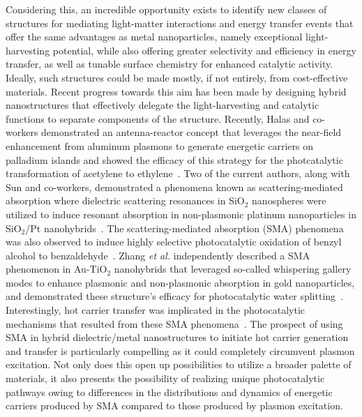 \documentclass[journal=jpclcd,manuscript=article]{achemso}
\begin{document}
Considering this, an incredible opportunity exists to identify new classes of structures for mediating light-matter interactions and energy transfer events that offer the same advantages as metal nanoparticles, 
namely exceptional light-harvesting potential, while also offering greater selectivity and efficiency in energy transfer, as well as tunable surface chemistry for enhanced catalytic activity.  
Ideally, such structures could be made mostly, if not entirely, from cost-effective materials.  Recent progress towards this aim has been made by designing hybrid 
nanostructures that effectively delegate the light-harvesting and catalytic functions to separate components of the structure.  Recently, Halas and co-workers 
demonstrated an antenna-reactor concept that leverages the near-field enhancement from aluminum plasmons to generate energetic carriers on 
palladium islands and showed the efficacy of this strategy for the photcatalytic transformation of acetylene to ethylene~\cite{SZZ_PNAS_2016}.
Two of the current authors, along with Sun and co-workers, demonstrated a phenomena known as scattering-mediated absorption where dielectric
scattering resonances in SiO$_2$ nanospheres were utilized to induce resonant absorption in non-plasmonic platinum nanoparticles in SiO$_2$/Pt nanohybrids~\cite{ZHX_NatPhoton_2016}.
The scattering-mediated absorption (SMA) phenomena was also observed to induce highly selective photocatalytic oxidation of benzyl alcohol to benzaldehyde~\cite{ZHX_NatPhoton_2016}.
Zhang {\it et al.} independently described a SMA phenomenon in Au-TiO$_2$ nanohybrids that leveraged so-called whispering gallery modes to 
enhance plasmonic and non-plasmonic absorption in gold nanoparticles, and demonstrated these structure's efficacy for photocatalytic water splitting~\cite{ZJM_ACSNano_2016}.
Interestingly, hot carrier transfer was implicated in the photocatalytic mechanisms that resulted from these SMA phenomena~\cite{ZHX_NatPhoton_2016,ZJM_ACSNano_2016}.
The prospect of using SMA in hybrid dielectric/metal nanostructures to initiate hot carrier generation and transfer is particularly 
compelling as it could completely circumvent plasmon excitation.  Not only does this open up possibilities to utilize a broader palette of materials, it also
presents the possibility of realizing unique photocatalytic pathways owing to differences in the distributions and dynamics of energetic carriers produced by SMA compared
to those produced by plasmon excitation.    
\end{document}
